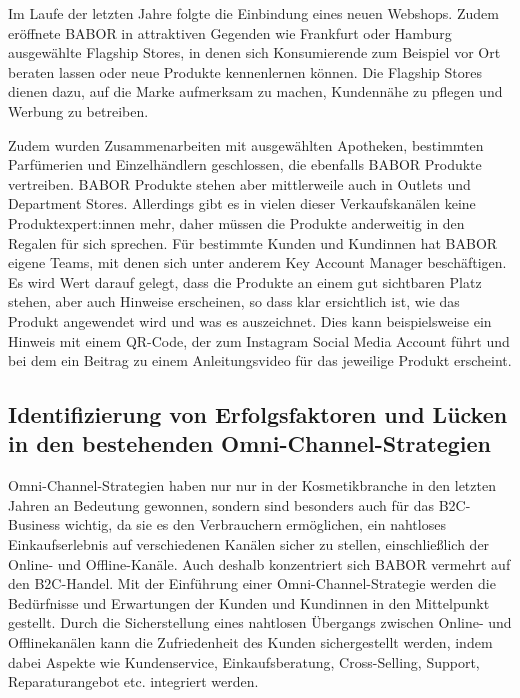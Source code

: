 Im Laufe der letzten Jahre folgte die Einbindung eines neuen Webshops. Zudem eröffnete BABOR in attraktiven Gegenden wie Frankfurt oder Hamburg ausgewählte Flagship Stores, in denen sich Konsumierende zum Beispiel vor Ort beraten lassen oder neue Produkte kennenlernen können. Die Flagship Stores dienen dazu, auf die Marke aufmerksam zu machen, Kundennähe zu pflegen und Werbung zu betreiben.
\newline

Zudem wurden Zusammenarbeiten mit ausgewählten Apotheken, bestimmten Parfümerien und Einzelhändlern geschlossen, die ebenfalls BABOR Produkte vertreiben. BABOR Produkte stehen aber mittlerweile auch in Outlets und Department Stores. Allerdings gibt es in vielen dieser Verkaufskanälen keine Produktexpert:innen mehr, daher müssen die Produkte anderweitig in den Regalen für sich sprechen. Für bestimmte Kunden und Kundinnen hat BABOR eigene Teams, mit denen sich unter anderem Key Account Manager beschäftigen. Es wird Wert darauf gelegt, dass die Produkte an einem gut sichtbaren Platz stehen, aber auch Hinweise erscheinen, so dass klar ersichtlich ist, wie das Produkt angewendet wird und was es auszeichnet. Dies kann beispielsweise ein Hinweis mit einem QR-Code, der zum Instagram Social Media Account führt und bei dem ein Beitrag zu einem Anleitungsvideo für das jeweilige Produkt erscheint.

\subsection{Identifizierung von Erfolgsfaktoren und Lücken in den bestehenden Omni-Channel-Strategien}\label{unterabschnitt_4_4}
Omni-Channel-Strategien haben nur nur in der Kosmetikbranche in den letzten Jahren an Bedeutung gewonnen, sondern sind besonders auch für das B2C-Business wichtig, da sie es den Verbrauchern ermöglichen, ein nahtloses Einkaufserlebnis auf verschiedenen Kanälen sicher zu stellen, einschließlich der Online- und Offline-Kanäle. Auch deshalb konzentriert sich BABOR vermehrt auf den B2C-Handel.
Mit der Einführung einer Omni-Channel-Strategie werden die Bedürfnisse und Erwartungen der Kunden und Kundinnen in den Mittelpunkt gestellt. Durch die Sicherstellung eines nahtlosen Übergangs zwischen Online- und Offlinekanälen kann die Zufriedenheit des Kunden sichergestellt werden, indem dabei Aspekte wie Kundenservice, Einkaufsberatung, Cross-Selling, Support, Reparaturangebot etc. integriert werden.
\newline

